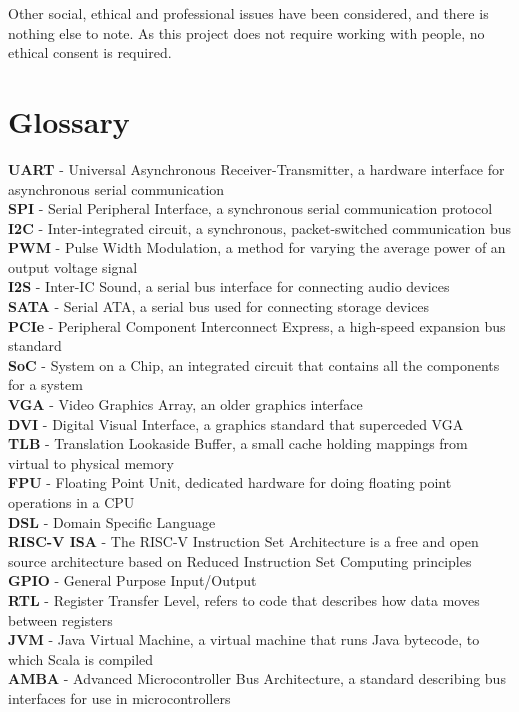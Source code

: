 \documentclass[a4paper,fleqn,12pt]{article}
\begin{document}
Other social, ethical and professional issues have been considered, and there is nothing else to note. As this project does not require working with people, no ethical consent is required.

\appendix
\section{Glossary}
\textbf{UART} - Universal Asynchronous Receiver-Transmitter, a hardware interface for asynchronous serial communication\\
\textbf{SPI} - Serial Peripheral Interface, a synchronous serial communication protocol\\
\textbf{I2C} - Inter-integrated circuit, a synchronous, packet-switched communication bus\\
\textbf{PWM} - Pulse Width Modulation, a method for varying the average power of an output voltage signal\\
\textbf{I2S} - Inter-IC Sound, a serial bus interface for connecting audio devices\\
\textbf{SATA} - Serial ATA, a serial bus used for connecting storage devices\\
\textbf{PCIe} - Peripheral Component Interconnect Express, a high-speed expansion bus standard\\
\textbf{SoC} - System on a Chip, an integrated circuit that contains all the components for a system\\
\textbf{VGA} - Video Graphics Array, an older graphics interface\\
\textbf{DVI} - Digital Visual Interface, a graphics standard that superceded VGA\\
\textbf{TLB} - Translation Lookaside Buffer, a small cache holding mappings from virtual to physical memory \\
\textbf{FPU} - Floating Point Unit, dedicated hardware for doing floating point operations in a CPU\\
\textbf{DSL} - Domain Specific Language\\
\textbf{RISC-V ISA} - The RISC-V Instruction Set Architecture is a free and open source architecture based on Reduced Instruction Set Computing principles\\
\textbf{GPIO} - General Purpose Input/Output \\
\textbf{RTL} - Register Transfer Level, refers to code that describes how data moves between registers\\
\textbf{JVM} - Java Virtual Machine, a virtual machine that runs Java bytecode, to which Scala is compiled\\
\textbf{AMBA} - Advanced Microcontroller Bus Architecture, a standard describing bus interfaces for use in microcontrollers\\



\end{document}
